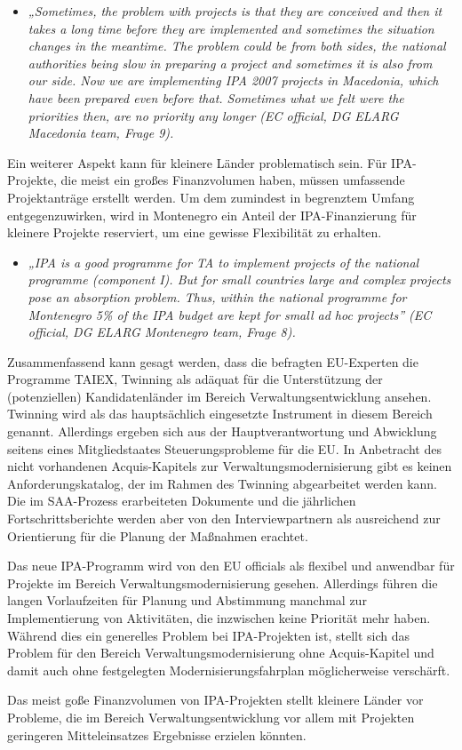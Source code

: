 \begin{itemize}[label={}]
\item \textit{„Sometimes, the problem with projects is that they are conceived and then it takes a long time before they are implemented and sometimes the situation changes in the meantime. The problem could be from both sides, the national authorities being slow in preparing a project and sometimes it is also from our side. Now we are implementing IPA 2007 projects in Macedonia, which have been prepared even before that. Sometimes what we felt were the priorities then, are no priority any longer (EC official, DG ELARG Macedonia team, Frage 9).}
\end{itemize}
Ein weiterer Aspekt kann für kleinere Länder problematisch sein. Für IPA-Projekte, die meist ein großes Finanzvolumen haben, müssen umfassende Projektanträge erstellt werden. Um dem zumindest in begrenztem Umfang entgegenzuwirken, wird in Montenegro ein Anteil der IPA-Finanzierung für kleinere Projekte reserviert, um eine gewisse Flexibilität zu erhalten.
\begin{itemize}[label={}]
\item \textit{„IPA is a good programme for TA to implement projects of the national programme (component I). But for small countries large and complex projects pose an absorption problem. Thus, within the national programme for Montenegro 5\% of the IPA budget are kept for small ad hoc projects” (EC official, DG ELARG Montenegro team, Frage 8).}
\end{itemize}
Zusammenfassend kann gesagt werden, dass die befragten EU-Experten die Programme TAIEX, Twinning als adäquat für die Unterstützung der (potenziellen) Kandidatenländer im Bereich Verwaltungsentwicklung ansehen. Twinning wird als das hauptsächlich eingesetzte Instrument in diesem Bereich genannt. Allerdings ergeben sich aus der Hauptverantwortung und Abwicklung seitens eines Mitgliedstaates Steuerungsprobleme für die EU. In Anbetracht des nicht vorhandenen Acquis-Kapitels zur Verwaltungsmodernisierung gibt es keinen Anforderungskatalog, der im Rahmen des Twinning abgearbeitet werden kann. Die im SAA-Prozess erarbeiteten Dokumente und die jährlichen Fortschrittsberichte werden aber von den Interviewpartnern als ausreichend zur Orientierung für die Planung der Maßnahmen erachtet.\par
Das neue IPA-Programm wird von den EU officials als flexibel und anwendbar für Projekte im Bereich Verwaltungsmodernisierung gesehen. Allerdings führen die langen Vorlaufzeiten für Planung und Abstimmung manchmal zur Implementierung von Aktivitäten, die inzwischen keine Priorität mehr haben. Während dies ein generelles Problem bei IPA-Projekten ist, stellt sich das Problem für den Bereich Verwaltungsmodernisierung ohne Acquis-Kapitel und damit auch ohne festgelegten Modernisierungsfahrplan möglicherweise verschärft.\par
Das meist goße Finanzvolumen von IPA-Projekten stellt kleinere Länder vor Probleme, die im Bereich Verwaltungsentwicklung vor allem mit Projekten geringeren Mitteleinsatzes Ergebnisse erzielen könnten.

